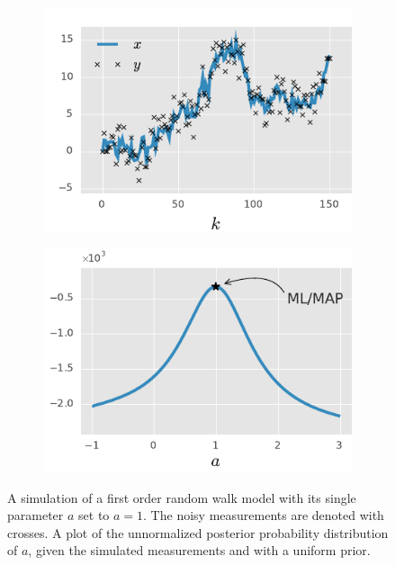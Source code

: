 \begin{figure}[htb]%
    \centering%
    \begin{subfigure}[t]{0.5\textwidth}%
    	\caption{}\label{fig:ar1_simulation}%
    	\includegraphics{img/ar1_ex_a}%
    \end{subfigure}%
    \begin{subfigure}[t]{0.5\textwidth}\centering%
		\caption{}\label{fig:ar1_lh}%
		\includegraphics{img/ar1_ex_b}%
    \end{subfigure}%
	\caption{%
	 A simulation of a first order random walk model with
	its single parameter $a$ set to $a=1$.%
   	The noisy measurements are denoted with crosses. %
   	 A plot of the unnormalized posterior probability distribution 
   	of $a$, given the simulated measurements and with a uniform prior.%
   	}
	\label{fig:ar1}
 \end{figure}


